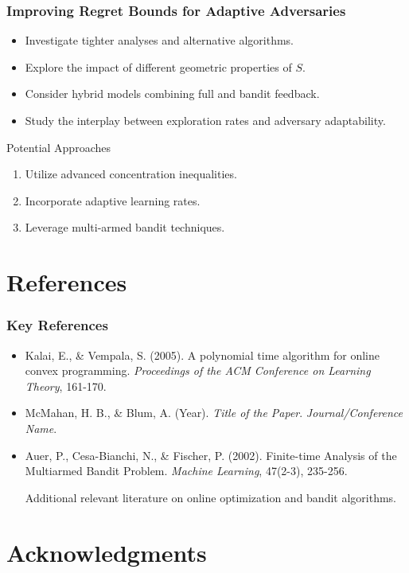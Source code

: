 \documentclass{beamer}
\begin{document}
\begin{frame}
\frametitle{Improving Regret Bounds for Adaptive Adversaries}
\begin{itemize}
    \item Investigate tighter analyses and alternative algorithms.
    \item Explore the impact of different geometric properties of \( S \).
    \item Consider hybrid models combining full and bandit feedback.
    \item Study the interplay between exploration rates and adversary adaptability.
\end{itemize}
\begin{block}{Potential Approaches}
    \begin{enumerate}
        \item Utilize advanced concentration inequalities.
        \item Incorporate adaptive learning rates.
        \item Leverage multi-armed bandit techniques.
    \end{enumerate}
\end{block}
\end{frame}

\section{References}

\begin{frame}
\frametitle{Key References}
\begin{itemize}
    \item Kalai, E., \& Vempala, S. (2005). A polynomial time algorithm for online convex programming. \textit{Proceedings of the ACM Conference on Learning Theory}, 161-170.
    \item McMahan, H. B., \& Blum, A. (Year). \textit{Title of the Paper}. \textit{Journal/Conference Name}.
    \item Auer, P., Cesa-Bianchi, N., \& Fischer, P. (2002). Finite-time Analysis of the Multiarmed Bandit Problem. \textit{Machine Learning}, 47(2-3), 235-256.
    \item [Additional relevant literature on online optimization and bandit algorithms.]
\end{itemize}
\end{frame}

\section{Acknowledgments}
\end{document}
